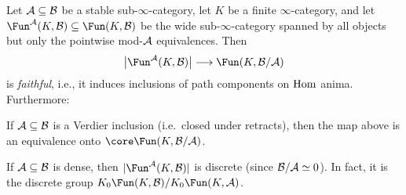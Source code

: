 \documentclass[a4paper, 10pt, oneside, DIV=9, chapterprefix=true, numbers=enddot,bibliography=totoc]{scrbook}
\newcommand{\embrace}[1]{\textup{(}#1\textup{)}}
\begin{document}
\begin{thm}\label{thm:Fibration}
	Let $\mathcal{A}\subseteq \mathcal{B}$ be a stable sub-$\infty$-category, let $K$ be a finite $\infty$-category, and let $\Fun^\Aa(K,\Bb)\subseteq \Fun(K,\Bb)$ be the wide sub-$\infty$-category spanned by all objects but only the pointwise mod-$\mathcal{A}$ equivalences. Then
	\begin{equation*}
		\big|\Fun^\Aa(K,\Bb)\big|\morphism \Fun(K,\Bb/\Aa)
	\end{equation*}
	is \emph{faithful}, i.e., it induces inclusions of path components on $\operatorname{Hom}$ anima. Furthermore:
	\begin{alphanumerate}
		\item If $\mathcal{A}\subseteq \mathcal{B}$ is a Verdier inclusion \embrace{i.e.\ closed under retracts}, then the map above is an equivalence onto $\core \Fun(K,\Bb/\Aa)$.
		\item If $\mathcal{A}\subseteq \mathcal{B}$ is dense, then $|\Fun^\Aa(K,\Bb)|$ is discrete \embrace{since $\mathcal{B}/\mathcal{A}\simeq 0$}. In fact, it is the discrete group $K_0\Fun(K,\Bb)/K_0\Fun(K,\Aa)$.
	\end{alphanumerate}
\end{thm}
\end{document}
